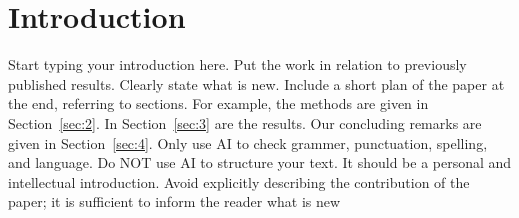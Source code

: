 \documentclass[a4paper,fleqn]{cas-sc} %
\begin{document}
\maketitle

\renewcommand{\figurename}{Fig.}

\theoremstyle{plain}%
\newtheorem{theorem}{Theorem}
\newtheorem{exa}{Example}
\newtheorem{rem}{Remark}
\newtheorem{proposition}{Proposition}
\newtheorem{lemma}{Lemma}
\newtheorem{corollary}{Corollary}

\theoremstyle{definition}
\newtheorem{definition}{Definition}
\newtheorem{remark}{Remark}
\newtheorem{example}{Example}
\newtheorem{assumption}{Assumption}


\newenvironment{Proof}{\paragraph{\textbf{\upshape Proof:}}}{\hfill$\square$}
\newenvironment{Proofx}[1]{\paragraph{\textbf{\upshape Proof of Theorem \ref{#1}:}}}{\hfill$\square$}

\def\E{\mbox{${\rm E}$}}
\def\D{\mbox{${\rm D}$}}



\begin{abstract}
The abstract should be short, informative, and avoid external references as much as possible. Follows a list of a few keywords in alphabetical order, and then Classification Codes, available for free from MathSciNet; see \url{mathscinet.ams.org/mathscinet/freeTools.html?version=2}.
\end{abstract}

\section{Introduction\label{sec:1}}

Start typing your introduction here. Put the work in relation to previously published results. Clearly state what is new. Include a short plan of the paper at the end, referring to sections. For example, the methods are given in Section~\ref{sec:2}. In Section~\ref{sec:3} are the results. Our concluding remarks are given in Section~\ref{sec:4}. Only use AI to check grammer, punctuation, spelling, and language. Do NOT use AI to structure your text. It should be a personal and intellectual introduction. Avoid explicitly describing the contribution of the paper; it is sufficient to inform the reader what is new
\end{document}
